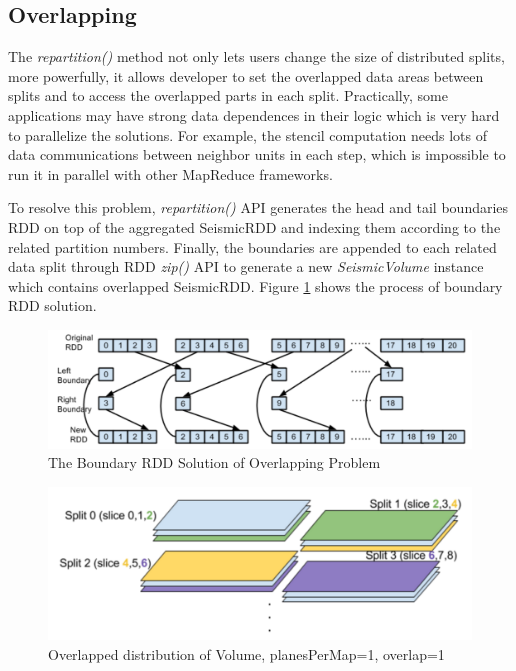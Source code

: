 \subsection{Overlapping}

The \emph{repartition()} method not only lets users change the size of distributed splits, more powerfully, it allows developer to set the overlapped data areas between splits and to access the overlapped parts in each split. Practically, some applications may have strong data dependences in their logic which is very hard to parallelize the solutions. For example, the stencil computation needs lots of data communications between neighbor units in each step, which is impossible to run it in parallel with other MapReduce frameworks. 

To resolve this problem, \emph{repartition()} API generates the head and tail boundaries RDD on top of the aggregated SeismicRDD and indexing them according to the related partition numbers. Finally, the boundaries are appended to each related data split through RDD \emph{zip()} API to generate a new \emph{SeismicVolume} instance which contains overlapped SeismicRDD. Figure \ref{boundaryRDD} shows the process of boundary RDD solution.

\begin{figure}[h]
\centering
\includegraphics[scale=0.5]{figures/boundaryRDD.png}
\caption{The Boundary RDD Solution of Overlapping Problem}
\label{boundaryRDD}
\end{figure}

\begin{figure}[h]
\centering
\includegraphics[scale=0.5]{figures/Overlap.png}
\caption{Overlapped distribution of Volume, planesPerMap=1, overlap=1}
\label{Overlap}
\end{figure}


